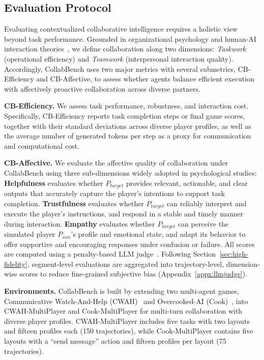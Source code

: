 \documentclass{article}
\theoremstyle{plain}
\theoremstyle{definition}
\theoremstyle{remark}
\begin{document}
\subsection{Evaluation Protocol}













Evaluating contextualized collaborative intelligence requires a holistic view beyond task performance. Grounded in organizational psychology and human-AI interaction theories~\cite{george1990personality,mcallister1995affect,salas2005there}, we define collaboration along two dimensions: \emph{Taskwork} (operational efficiency) and \emph{Teamwork} (interpersonal interaction quality). Accordingly, CollabBench uses two major metrics with several submetrics, CB-Efficiency and CB-Affective, to assess whether agents balance efficient execution with affectively proactive collaboration across diverse partners.

\textbf{CB-Efficiency.} We assess task performance, robustness, and interaction cost. Specifically, CB-Efficiency reports task completion steps or final game scores, together with their standard deviations across diverse player profiles, as well as the average number of generated tokens per step as a proxy for communication and computational cost.

\textbf{CB-Affective.} We evaluate the affective quality of collaboration under CollabBench using three sub-dimensions widely adopted in psychological studies: \textbf{Helpfulness} evaluates whether $P_{target}$ provides relevant, actionable, and clear outputs that accurately capture the player’s intentions to support task completion. \textbf{Trustfulness} evaluates whether $P_{target}$ can reliably interpret and execute the player’s instructions, and respond in a stable and timely manner during interaction. \textbf{Empathy} evaluates whether $P_{target}$ can perceive the simulated player $P_{sim}$'s profile and emotional state, and adapt its behavior to offer supportive and encouraging responses under confusion or failure. All scores are computed using a penalty-based LLM judge~\cite{0001WZY00YGC00X25}. Following Section~\ref{sec:high-fidelity}, segment-level evaluations are aggregated into trajectory-level, dimension-wise scores to reduce fine-grained subjective bias (Appendix~\ref{appx:llmjudge}).

\textbf{Environments.} CollabBench is built by extending two multi-agent games, Communicative Watch-And-Help (CWAH)~\cite{ZhangDSZDTSG24} and Overcooked-AI (Cook)~\cite{CarrollSHGSAD19}, into CWAH-MultiPlayer and Cook-MultiPlayer for multi-turn collaboration with diverse player profiles. CWAH-MultiPlayer includes five tasks with two layouts and fifteen profiles each (150 trajectories), while Cook-MultiPlayer contains five layouts with a ``send message'' action and fifteen profiles per layout (75 trajectories).
\end{document}
